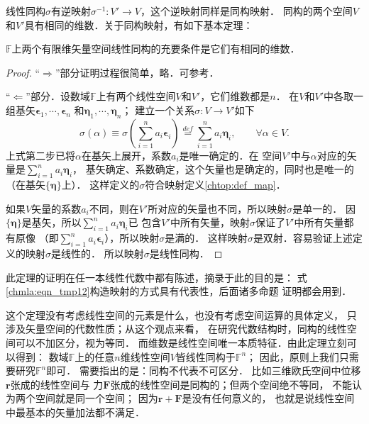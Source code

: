 线性同构$\sigma$有逆映射$\sigma^{-1}:V'\to V$，这个逆映射同样是同构映射．
同构的两个空间$V$和$V'$具有相同的维数．关于同构映射，有如下基本定理：
\begin{theorem}\label{chmla:thm_vvp-basic}
    $\mathbb{F}$上两个有限维矢量空间线性同构的充要条件是它们有相同的维数．
\end{theorem}
\begin{proof}
    “$\Rightarrow$”部分证明过程很简单，略．可参考\parencite[\S 8.3]{qiuws-2019-v2}．

    “$\Leftarrow$”部分．设数域$\mathbb{F}$上有两个线性空间$V$和$V'$，它们维数都是$n$．
    在$V$和$V'$中各取一组基矢$\boldsymbol{\epsilon}_1,\cdots,\boldsymbol{\epsilon}_n$
    和$\boldsymbol{\eta}_1,\cdots,\boldsymbol{\eta}_n$；
    建立一个关系$\sigma : V \to V'$如下
    \begin{equation}\label{chmla:eqn_tmp12}
        \sigma (\alpha) \equiv
        \sigma \left(\sum_{i=1}^{n} a_i \boldsymbol{\epsilon}_i \right)
        \overset{def}{=}
        \sum_{i=1}^{n} a_i \boldsymbol{\eta}_i,
        \qquad \forall \alpha \in V.
    \end{equation}
    上式第二步已将$\alpha$在基矢上展开，系数$a_i$是唯一确定的．在
    空间$V'$中与$\alpha$对应的矢量是$\sum_{i=1}^{n} a_i \boldsymbol{\eta}_i$，
    基矢确定、系数确定，这个矢量也是确定的，同时也是唯一的（在基矢$\{\boldsymbol{\eta}\}$上）．
    这样定义的$\sigma$符合映射定义\ref{chtop:def_map}．

    如果$V$矢量的系数$a_i$不同，则在$V'$所对应的矢量也不同，所以映射$\sigma$是单一的．
    因$\{\boldsymbol{\eta}\}$是基矢，所以$\sum_{i=1}^{n} a_i \boldsymbol{\eta}_i$已
    包含$V'$中所有矢量，映射$\sigma$保证了$V'$中所有矢量都有原像
    （即$\sum_{i=1}^{n} a_i \boldsymbol{\epsilon}_i$），所以映射$\sigma$是满的．
    这样映射$\sigma$是双射．容易验证上述定义的映射$\sigma$是线性的．
    所以映射$\sigma$是线性同构．
\end{proof}
此定理的证明在任一本线性代数中都有陈述，摘录于此的目的是：
式\eqref{chmla:eqn_tmp12}构造映射的方式具有代表性，后面诸多命题
证明都会用到．

这个定理没有考虑线性空间的元素是什么，也没有考虑空间运算的具体定义，
只涉及矢量空间的代数性质；从这个观点来看，
在研究代数结构时，同构的线性空间可以不加区分，视为等同．
而维数是线性空间唯一本质特征．由此定理立刻可以得到：
数域$\mathbb{F}$上的任意$n$维线性空间$V$皆线性同构于$\mathbb{F}^n$；
因此，原则上我们只需要研究$\mathbb{F}^n$即可．
需要指出的是：同构不代表不可区分．
比如三维欧氏空间中位移$\boldsymbol{r}$张成的线性空间与
力$\boldsymbol{F}$张成的线性空间是同构的；但两个空间绝不等同，
不能认为两个空间就是同一个空间；
因为$\boldsymbol{r}+\boldsymbol{F}$是没有任何意义的，
也就是说线性空间中最基本的矢量加法都不满足．

